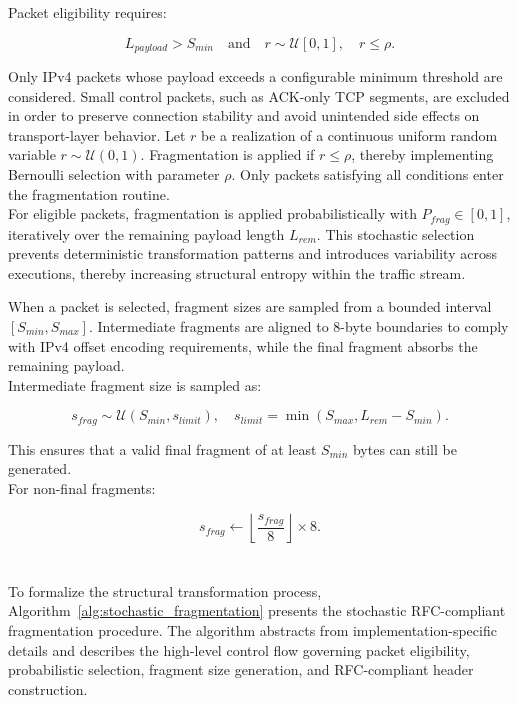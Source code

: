 Packet eligibility requires:

\[
L_{payload} > S_{min}
\quad \text{and} \quad
r \sim \mathcal{U}[0,1], \quad r \le \rho.
\]

Only IPv4 packets whose payload exceeds a configurable minimum threshold are considered. Small control packets, such as ACK-only TCP segments, are excluded in order to preserve connection stability and avoid unintended side effects on transport-layer behavior.
Let $r$ be a realization of a continuous uniform random variable $r \sim \mathcal{U}(0,1)$. Fragmentation is applied if $r \le \rho$, thereby implementing Bernoulli selection with parameter $\rho$.
Only packets satisfying all conditions enter the fragmentation routine.
\\

For eligible packets, fragmentation is applied probabilistically with $P_{frag} \in [0,1]$, iteratively over the remaining payload length $L_{rem}$. This stochastic selection prevents deterministic transformation patterns and introduces variability across executions, thereby increasing structural entropy within the traffic stream.

When a packet is selected, fragment sizes are sampled from a bounded interval $[S_{min}, S_{max}]$. Intermediate fragments are aligned to 8-byte boundaries to comply with IPv4 offset encoding requirements, while the final fragment absorbs the remaining payload. 
\\

Intermediate fragment size is sampled as:

\[
s_{frag} \sim \mathcal{U}(S_{min}, s_{limit}),
\quad
s_{limit} = \min(S_{max}, L_{rem} - S_{min}).
\]

This ensures that a valid final fragment of at least $S_{min}$ bytes can still be generated.
\\

For non-final fragments:

\[
s_{frag} \leftarrow \left\lfloor \frac{s_{frag}}{8} \right\rfloor \times 8.
\]
\\\\
To formalize the structural transformation process, Algorithm~\ref{alg:stochastic_fragmentation} presents the stochastic RFC-compliant fragmentation procedure. The algorithm abstracts from implementation-specific details and describes the high-level control flow governing packet eligibility, probabilistic selection, fragment size generation, and RFC-compliant header construction.

